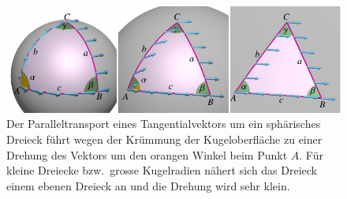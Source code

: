 %
%
%
\begin{figure}
\centering
\includegraphics{chapters/110-kruemmung/images/exzess.pdf}
\caption{Der Paralleltransport eines Tangentialvektors um ein 
sphärisches Dreieck führt wegen der Krümmung der Kugeloberfläche
zu einer Drehung des Vektors um den orangen Winkel beim Punkt $A$.
Für kleine Dreiecke bzw.~grosse Kugelradien nähert sich das
Dreieck einem ebenen Dreieck an und die Drehung wird sehr klein.
\label{buch:kruemmung:fig:exzess}}
\end{figure}
